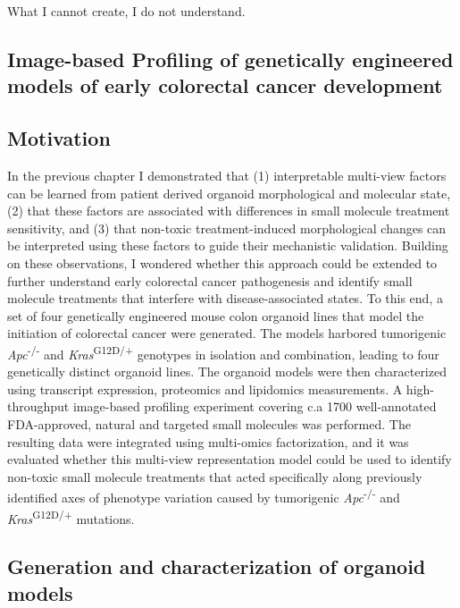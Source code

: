 \begin{savequote}[75mm]
What I cannot create, I do not understand.
\end{savequote}

\begin{flushleft}
\chapter{Image-based Profiling of genetically engineered models of early colorectal cancer development}

\section{Motivation}

In the previous chapter I demonstrated that (1) interpretable multi-view factors can be learned from patient derived organoid morphological and molecular state, (2) that these factors are associated with differences in small molecule treatment sensitivity, and (3) that non-toxic treatment-induced morphological changes can be interpreted using these factors to guide their mechanistic validation. Building on these observations, I wondered whether this approach could be extended to further understand early colorectal cancer pathogenesis and identify small molecule treatments that interfere with disease-associated states.
\bigskip
To this end, a set of four genetically engineered mouse colon organoid lines that model the initiation of colorectal cancer were generated. The models harbored tumorigenic \textit{Apc}\textsuperscript{-/-} and \textit{Kras}\textsuperscript{G12D/+} genotypes in isolation and combination, leading to four genetically distinct organoid lines. The organoid models were then characterized using transcript expression, proteomics and lipidomics measurements. A high-throughput image-based profiling experiment covering c.a 1700 well-annotated FDA-approved, natural and targeted small molecules was performed. The resulting data were integrated using multi-omics factorization, and it was evaluated whether this multi-view representation model could be used to identify non-toxic small molecule treatments that acted specifically along previously identified axes of phenotype variation caused by tumorigenic \textit{Apc}\textsuperscript{-/-} and \textit{Kras}\textsuperscript{G12D/+} mutations. 

\section{Generation and characterization of organoid models}


\end{flushleft}
